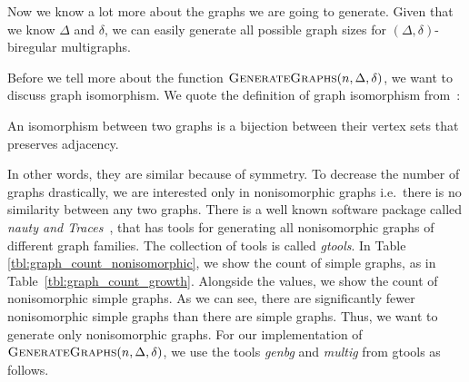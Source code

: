 Now we know a lot more about the graphs we are going to generate.
Given that we know $\Delta$ and $\delta$, we can easily generate all possible graph sizes for $(\Delta, \delta)$-biregular multigraphs.

Before we tell more about the function $\textsc{GenerateGraphs}(n, \Delta, \delta)$, we want to discuss graph isomorphism.
We quote the definition of graph isomorphism from~\cite{DBLP:journals/jsc/McKayP14}:
\begin{displayquote}
An isomorphism between two graphs is a bijection between their vertex sets that preserves adjacency.
\end{displayquote}
In other words, they are similar because of symmetry.
To decrease the number of graphs drastically, we are interested only in nonisomorphic graphs i.e.\ there is no similarity between any two graphs.
There is a well known software package called \emph{nauty and Traces}~\cite{DBLP:journals/jsc/McKayP14}, that has tools for generating all nonisomorphic graphs of different graph families.
The collection of tools is called \emph{gtools}.
In Table \ref{tbl:graph_count_nonisomorphic}, we show the count of simple graphs, as in Table~\ref{tbl:graph_count_growth}.
Alongside the values, we show the count of nonisomorphic simple graphs.
As we can see, there are significantly fewer nonisomorphic simple graphs than there are simple graphs.
Thus, we want to generate only nonisomorphic graphs.
For our implementation of $\textsc{GenerateGraphs}(n, \Delta, \delta)$, we use the tools \emph{genbg} and \emph{multig} from gtools as follows.


